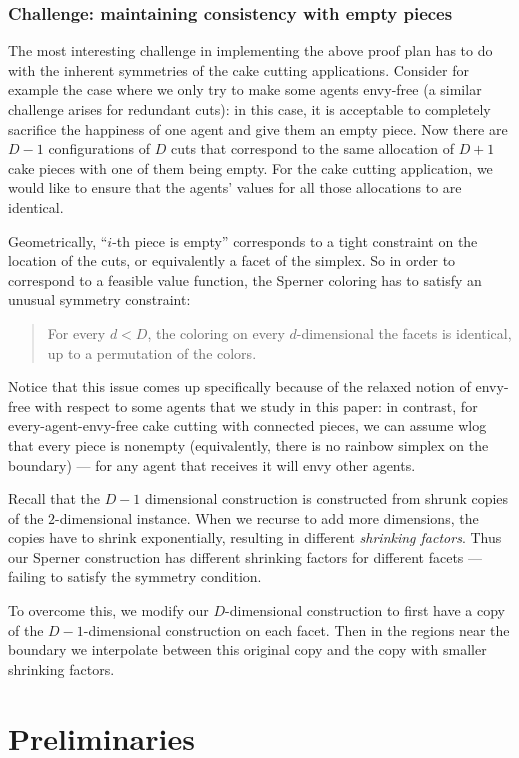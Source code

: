 \documentclass[letterpaper,11pt]{article}
\begin{document}
\subsubsection*{Challenge: maintaining consistency with empty pieces}
The most interesting challenge in implementing the above proof plan has to do with the inherent symmetries of the cake cutting applications. Consider for example the case where we only try to make some agents envy-free (a similar challenge arises for redundant cuts): in this case, it is acceptable to completely sacrifice the happiness of one agent and give them an empty piece. Now there are $D-1$ configurations of $D$ cuts that correspond to the same allocation of $D+1$ cake pieces with one of them being empty. 
For the cake cutting application, we would like to ensure that the agents' values for all those allocations to are identical.

Geometrically, ``$i$-th piece is empty'' corresponds to a tight constraint on the location of the cuts, or equivalently a facet of the simplex. So in order to correspond to a feasible value function, the Sperner coloring has to satisfy an unusual symmetry constraint: 
\begin{quote}
    For every $d<D$, the coloring on every $d$-dimensional the facets is identical, up to a permutation of the colors. 
\end{quote}

Notice that this issue comes up specifically because of the relaxed notion of envy-free with respect to some agents that we study in this paper: in contrast, for every-agent-envy-free cake cutting with connected pieces, we can assume wlog that every piece is nonempty (equivalently, there is no rainbow simplex on the boundary) --- for any  agent that receives it will envy other agents.

Recall that the $D-1$ dimensional construction is constructed from shrunk copies of the $2$-dimensional instance. When we recurse to add more dimensions, the copies have to shrink exponentially, resulting in different {\em shrinking factors}. Thus our Sperner  construction has different shrinking factors for different facets --- failing to satisfy the symmetry condition. 

To overcome this, we modify our $D$-dimensional construction to first have a copy of the $D-1$-dimensional construction on each facet. Then in the regions near the boundary we interpolate between this original copy and the copy with smaller shrinking factors. 

\section{Preliminaries}
\label{sec:prelim}

\end{document}
